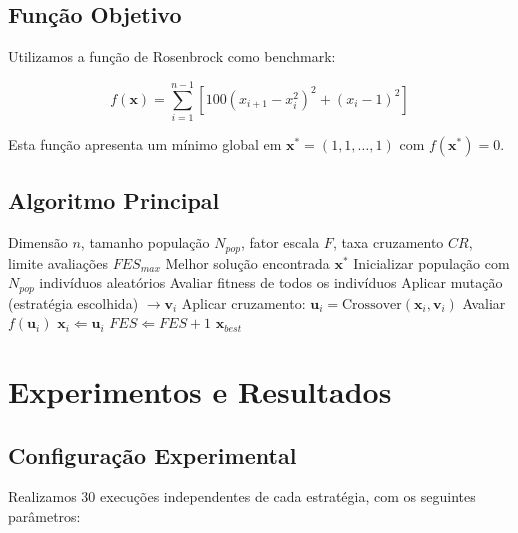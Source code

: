 \documentclass[runningheads]{llncs}
\begin{document}
\subsection{Função Objetivo}

Utilizamos a função de Rosenbrock como benchmark:

\begin{equation}
f(\mathbf{x}) = \sum_{i=1}^{n-1} [100(x_{i+1} - x_i^2)^2 + (x_i - 1)^2]
\end{equation}

Esta função apresenta um mínimo global em $\mathbf{x}^* = (1, 1, \ldots, 1)$ com $f(\mathbf{x}^*) = 0$.

\subsection{Algoritmo Principal}

\begin{algorithm}[H]
\caption{Differential Evolution}\label{alg:de}
\begin{algorithmic}[1]
\Require Dimensão $n$, tamanho população $N_{pop}$, fator escala $F$, taxa cruzamento $CR$, limite avaliações $FES_{max}$
\Ensure Melhor solução encontrada $\mathbf{x}^*$
\State Inicializar população com $N_{pop}$ indivíduos aleatórios
\State Avaliar fitness de todos os indivíduos
        \State Aplicar mutação (estratégia escolhida) $\rightarrow \mathbf{v}_i$
        \State Aplicar cruzamento: $\mathbf{u}_i = \text{Crossover}(\mathbf{x}_i, \mathbf{v}_i)$
        \State Avaliar $f(\mathbf{u}_i)$
            \State $\mathbf{x}_i \Leftarrow \mathbf{u}_i$
        \EndIf
        \State $FES \Leftarrow FES + 1$
    \EndFor
\EndWhile
\State \Return $\mathbf{x}_{best}$
\end{algorithmic}
\end{algorithm}

\section{Experimentos e Resultados}

\subsection*{Configuração Experimental}

Realizamos 30 execuções independentes de cada estratégia, com os seguintes parâmetros:
\end{document}
